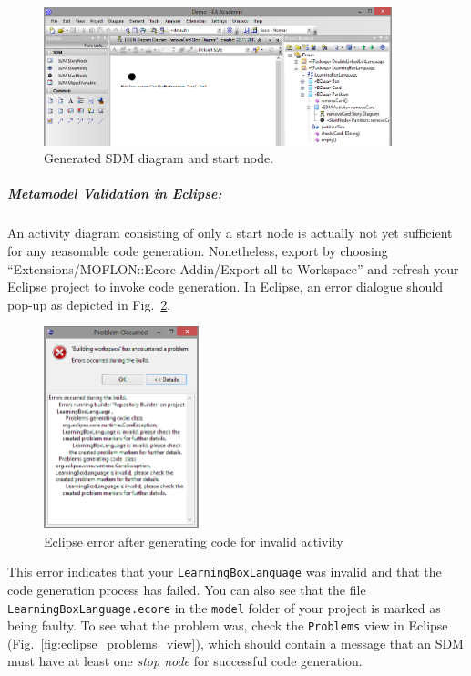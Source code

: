 \begin{figure}[htp]
\begin{center}
  \includegraphics[width=0.9\textwidth]{pics/sdmBilder/removeCard/sdm02RAW}
  \caption{Generated SDM diagram and start node.}  
  \label{fig:sdm_skeleton}
\end{center}
\end{figure}

\subparagraph{Metamodel Validation in Eclipse:}
\label{par:validation_in_eclipse}
An activity diagram consisting of only a start node is actually not yet sufficient for any reasonable code generation. 
Nonetheless, export by choosing ``Extensions/\-MOFLON::Ecore Addin/\-Export all to Workspace'' and refresh your Eclipse project to invoke code generation. 
In Eclipse, an error dialogue should pop-up as depicted in Fig.~\ref{fig:eclipse_error}.

\begin{figure}[htp]
\begin{center}
  \includegraphics[width=0.4\textwidth]{pics/sdmBilder/removeCard/sdm15RAW}
  \caption{Eclipse error after generating code for invalid activity}  
  \label{fig:eclipse_error}
\end{center}
\end{figure}

This error indicates that your \texttt{Learning\-Box\-Language} was invalid and that the code generation process has failed. 
You can also see that the file \texttt{Learning\-Box\-Language.\-ecore} in the \texttt{model} folder of your project is marked as being faulty.
To see what the problem was, check the \texttt{Problems} view in Eclipse (Fig.~\ref{fig:eclipse_problems_view}), 
which should contain a message that an SDM must have at least one \emph{stop node} for successful code generation.

